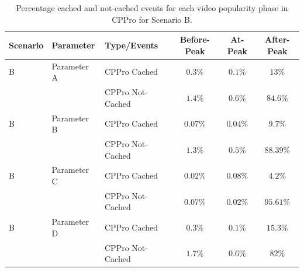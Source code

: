 \documentclass[10pt,final,journal,a4paper]{IEEEtran}
\begin{document}
\begin{table}[!t]
\caption{Percentage cached and not-cached events for each video popularity phase in CPPro for Scenario B.}
\label{tab:stacked2b}
\centering
\begin{tabular}{|l|l|l|c|c|c|}
\hline
Scenario & Parameter & Type/Events & Before-Peak & At-Peak  & After-Peak \\
\hline
B & Parameter A & CPPro Cached & $0.3\%$ & $0.1\%$ & $13\%$  \\
\hline
 & & CPPro Not-Cached & $1.4\%$ & $0.6\%$ & $84.6\%$ \\
 \hline

B & Parameter B & CPPro Cached & $0.07\%$ & $0.04\%$ & $9.7\%$ \\
\hline
 & & CPPro Not-Cached & $1.3\%$ & $0.5\%$ & $88.39\%$ \\
\hline

B & Parameter C & CPPro Cached & $0.02\%$ & $0.08\%$ & $4.2\%$ \\
\hline
 & & CPPro Not-Cached & $0.07\%$ & $0.02\%$ & $95.61\%$ \\
\hline

B & Parameter D & CPPro Cached & $0.3\%$ & $0.1\%$ & $15.3\%$ \\
\hline
 & & CPPro Not-Cached & $1.7\%$ & $0.6\%$ & $82\%$ \\
\hline

\end{tabular}
\end{table}
\end{document}
